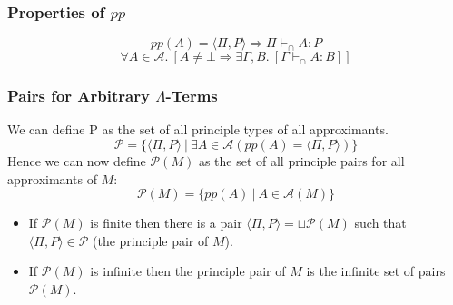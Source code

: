\subsubsection{Properties of $pp$}
\[pp(A) = \langle \Pi, P \rangle \Rightarrow \Pi \vdash_\cap A : P\]
\[\forall A \in \mathcal{A} . \ [A \neq \bot \Rightarrow \exists \Gamma, B . \ [\Gamma \vdash_\cap A : B]]\]

\subsubsection{Pairs for Arbitrary $\Lambda$-Terms}
We can define P as the set of all principle types of all approximants.
\[\mathcal{P} = \{ \langle \Pi, P \rangle \ | \ \exists A \in \mathcal{A} (pp(A) = \langle \Pi, P \rangle)\}\]
Hence we can now define $\mathcal{P}(M)$ as the set of all principle pairs for all approximants of $M$:
\[\mathcal{P}(M) = \{pp(A) \ | \ A \in \mathcal{A}(M)\}\]
\begin{itemize}
    \item If $\mathcal{P}(M)$ is finite then there is a pair $\langle \Pi, P \rangle = \sqcup \mathcal{P}(M)$ such that $\langle \Pi, P \rangle \in \mathcal{P}$ (the principle pair of $M$).
    \item If $\mathcal{P}(M)$ is infinite then the principle pair of $M$ is the infinite set of pairs $\mathcal{P}(M)$.
\end{itemize}



